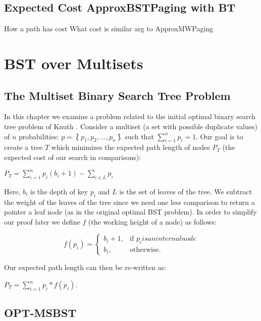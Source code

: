 \documentclass[letterpaper,12pt,titlepage,oneside,final]{book}
\theoremstyle{plain}
\begin{document}
\section{Expected Cost ApproxBSTPaging with BT}
How a path has cost
What cost is
similar arg to ApproxMWPaging

\chapter{BST over Multisets} \label{BST over Multisets}

\section{The Multiset Binary Search Tree Problem}\label{The Multiset Binary Search Tree Problem}

In this chapter we examine a problem related to the initial optimal binary search tree problem of Knuth \cite{knuth1971optimum}. Consider a multiset (a set with possible duplicate values) of $n$ probabilities: $p = \lbag p_1, p_2, ..., p_n \rbag$ such that $\sum\limits_{i=1}^n p_i = 1$. Our goal is to create a tree $T$ which minimizes the expected path length of nodes $P_T$ (the expected cost of our search in comparisons):
\begin{center}
$P_T = \sum_{i=1}^{n} p_i(b_i+1) - \sum_{i \in L}p_i$
\end{center}
Here, $b_i$ is the depth of key $p_i$ and $L$ is the set of leaves of the tree. We subtract the weight of the leaves of the tree since we need one less comparison to return a pointer a leaf node (as in the original optimal BST problem). In order to simplify our proof later we define $f$ (the working height of a node) as follows:
\begin{center}
\[
    f(p_i)= 
\begin{cases}
    b_i+1,& \text{if } p_i is an internal node\\
    b_i,              & \text{otherwise}.
\end{cases}
\]
\end{center}
Our expected path length can then be re-written as:
\begin{center}
$P_T = \sum_{i=1}^{n} p_i*f(p_i)$.
\end{center}

\section{OPT-MSBST}
\end{document}
